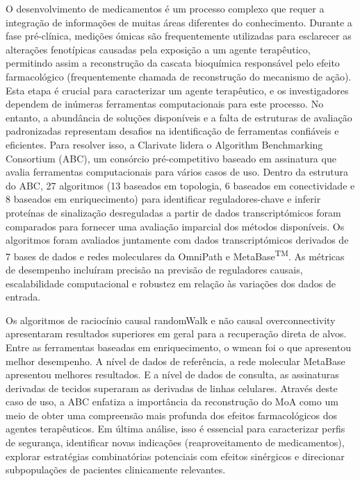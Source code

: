 ﻿%

%

O desenvolvimento de medicamentos é um processo complexo que requer a integração de informações de muitas áreas diferentes do conhecimento.
Durante a fase pré-clínica, medições ómicas são frequentemente utilizadas para esclarecer as alterações fenotípicas causadas pela exposição a um agente terapêutico, permitindo assim a reconstrução da cascata bioquímica responsável pelo efeito farmacológico (frequentemente chamada de reconstrução do mecanismo de ação).
Esta etapa é crucial para caracterizar um agente terapêutico, e os investigadores dependem de inúmeras ferramentas computacionais para este processo.
No entanto, a abundância de soluções disponíveis e a falta de estruturas de avaliação padronizadas representam desafios na identificação de ferramentas confiáveis e eficientes.
Para resolver isso, a Clarivate lidera o Algorithm Benchmarking Consortium (ABC), um consórcio pré-competitivo baseado em assinatura que avalia ferramentas computacionais para vários casos de uso.
Dentro da estrutura do ABC, 27 algoritmos (13 baseados em topologia, 6 baseados em conectividade e 8 baseados em enriquecimento) para identificar reguladores-chave e inferir proteínas de sinalização desreguladas a partir de dados transcriptómicos foram comparados para fornecer uma avaliação imparcial dos métodos disponíveis.
Os algoritmos foram avaliados juntamente com dados transcriptómicos derivados de 7 bases de dados e redes moleculares da OmniPath e MetaBase\textsuperscript{TM}.
As métricas de desempenho incluíram precisão na previsão de reguladores causais, escalabilidade computacional e robustez em relação às variações dos dados de entrada.

Os algoritmos de raciocínio causal randomWalk e não causal overconnectivity apresentaram resultados superiores em geral para a recuperação direta de alvos.
Entre as ferramentas baseadas em enriquecimento, o wmean foi o que apresentou melhor desempenho.
A nível de dados de referência, a rede molecular MetaBase apresentou melhores resultados. E a nível de dados de consulta, as assinaturas derivadas de tecidos superaram as derivadas de linhas celulares.
Através deste caso de uso, a ABC enfatiza a importância da reconstrução do MoA como um meio de obter uma compreensão mais profunda dos efeitos farmacológicos dos agentes terapêuticos.
Em última análise, isso é essencial para caracterizar perfis de segurança, identificar novas indicações (reaproveitamento de medicamentos), explorar estratégias combinatórias potenciais com efeitos sinérgicos e direcionar subpopulações de pacientes clinicamente relevantes.


